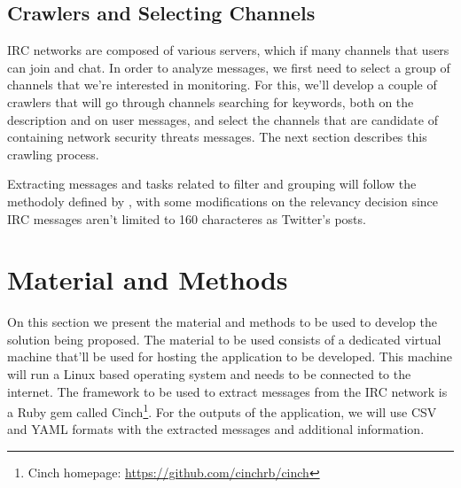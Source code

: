 \documentclass[12pt]{article}
\begin{document}
\subsection{Crawlers and Selecting Channels}

IRC networks are composed of various servers, which if many channels that
users can join and chat. In order to analyze messages, we first need to
select a group of channels that we're interested in monitoring.
%
For this, we'll develop a couple of crawlers that will go through channels
searching for keywords, both on the description and on user messages, and
select the channels that are candidate of containing network security threats
messages.
%
The next section describes this crawling process.

Extracting messages and tasks related to filter and grouping will follow
the methodoly defined by \cite{campiolo2013}, with some modifications on the
relevancy decision since IRC messages aren't limited to 160 characteres as
Twitter's posts.


\section{Material and Methods} \label{sec:methods}

On this section we present the material and methods to be used to develop the
solution being proposed.
%
The material to be used consists of a dedicated virtual machine that'll be
used for hosting the application to be developed. This machine will run a
Linux based operating system and needs to be connected to the internet.
%
The framework to be used to extract messages from the IRC network is a
Ruby gem called Cinch\footnote{Cinch homepage: %
\url{https://github.com/cinchrb/cinch}}.
%
For the outputs of the application, we will use CSV and YAML formats with
the extracted messages and additional information.
\end{document}
